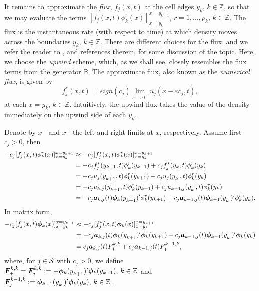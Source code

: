 It remains to approximate the \textit{flux}, \(f_j(x,t)\) at the cell edges \(y_k,\,k\in\mathbb Z\), so that we may evaluate the terms \([f_j(x,t)\phi^r_k(x)]_{x=y_k}^{x=y_{k+1}}\), \(r=1,...,p_k,\,k\in\mathbb Z\). %
The flux is the instantaneous rate (with respect to time) at which density moves across the boundaries \(y_k,\,k\in\mathbb Z\). There are different choices for the flux, and we refer the reader to \citep{c99,nodalDGBook}, and references therein, for some discussion of the topic. Here, we choose the \textit{upwind} scheme, which, as we shall see, closely resembles the flux terms from the generator \(\mathbb B\). The approximate flux, also known as the \textit{numerical flux}, is given by 
\[f^*_j(x,t) = sign(c_j)\lim_{\varepsilon\to0^+}u_j(x-\varepsilon c_j,t),\]
at each \(x=y_k,\,k\in\mathbb Z\). 
Intuitively, the upwind flux takes the value of the density immediately on the upwind side of each \(y_k\). 

Denote by \(x^-\) and \(x^+\) the left and right limits at \(x\), respectively. Assume first \(c_j>0\), then 
\begin{align*}
	-c_j[f_j(x,t)\phi^r_k(x)]_{x=y_k}^{x=y_{k+1}} & \approx -c_j[f_j^*(x,t)\phi^r_k(x)]_{x=y_k}^{x=y_{k+1}}
	\\& = -c_jf_j^*(y_{k+1},t)\phi^r_k(y_{k+1}) + c_jf_j^*(y_{k},t)\phi^r_k(y_{k})
	\\& = -c_ju_j(y_{k+1}^-,t)\phi^r_k(y_{k+1}) + c_ju_j(y_{k}^-,t)\phi^r_k(y_{k})
	\\& = -c_ju_{k,j}(y_{k+1}^-,t)\phi^r_k(y_{k+1}) + c_ju_{k-1,j}(y_{k}^-,t)\phi^r_k(y_{k})
	\\& = -c_j\boldsymbol a_{k,j}(t)\boldsymbol \phi_k(y_{k+1}^-)'{}\phi^r_k(y_{k+1}) + c_j\boldsymbol a_{k-1,j}(t)\boldsymbol \phi_{k-1}(y_{k}^-)'{}\phi^r_k(y_{k}).
\end{align*}
In matrix form,  
\begin{align*}
	-c_j[f_j(x,t)\boldsymbol\phi_k(x)]_{x=y_k}^{x=y_{k+1}} & \approx -c_j[f_j^*(x,t)\boldsymbol\phi_k(x)]_{x=y_k}^{x=y_{k+1}}
	\\& = -c_j\boldsymbol a_{k,j}(t)\boldsymbol \phi_k(y_{k+1}^-)'{}\boldsymbol\phi_k(y_{k+1}) + c_j\boldsymbol a_{k-1,j}(t)\boldsymbol \phi_{k-1}(y_{k}^-)'{}\boldsymbol\phi_k(y_{k})
	\\& = c_j\boldsymbol a_{k,j}(t)F_j^{k,k}+c_j\boldsymbol a_{k-1,j}(t)F_j^{k-1,k},
\end{align*}
where, for \(j\in \mathcal{S}\) with \(c_j>0\), we define \(\boldsymbol F_+^{k,k}=\boldsymbol F_j^{k,k} := -\boldsymbol \phi_k(y_{k+1}^-)'{}\boldsymbol\phi_k(y_{k+1}),\,k\in\mathbb Z\) and \(\boldsymbol F_j^{k-1,k} := \boldsymbol \phi_{k-1}(y_{k}^-)'{}\boldsymbol\phi_k(y_{k}),\,k\in\mathbb Z\).

